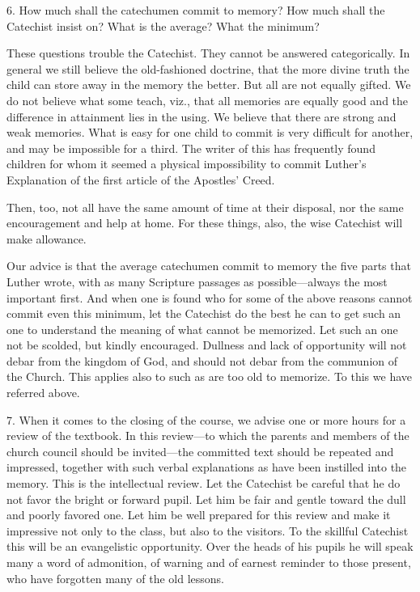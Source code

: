 6. How much shall the catechumen commit to memory? How much shall the Catechist insist on? What is the average? What the minimum?

These questions trouble the Catechist. They cannot be answered categorically. In general we still believe the old-fashioned doctrine, that the more
divine truth the child can store away in the memory the better. But all are not equally gifted.  We do not believe what some teach, viz., that all memories are equally good and the difference in attainment lies in the using. We believe that there are strong and weak memories. What is easy for one child to commit is very difficult for another, and may be impossible for a third. The writer of this has frequently found children for whom it seemed a physical impossibility to commit Luther’s Explanation of the first article of the Apostles’ Creed.

Then, too, not all have the same amount of time at their disposal, nor the same encouragement and help at home. For these things, also, the wise Catechist will make allowance.

Our advice is that the average catechumen commit to memory the five parts that Luther wrote, with as many Scripture passages as possible—always the most important first. And when one is found who for some of the above reasons cannot commit even this minimum, let the Catechist do the best he can to get such an one to understand the meaning of what cannot be memorized. Let such an one not be scolded, but kindly encouraged. Dullness and lack of opportunity will not debar from the kingdom of God, and should not debar from the communion of the Church. This applies also to such as are too old to memorize. To this we have referred above.

7.  When it comes to the closing of the course, we advise one or more hours for a review of the textbook. In this review—to which the parents and members of the church council should be invited—the committed text should be repeated and impressed, together with such verbal explanations as have been instilled into the memory. This is the intellectual review. Let the Catechist be careful that he do not favor the bright or forward pupil. Let him be fair and gentle toward the dull and poorly favored one. Let him be well prepared for this review and make it impressive not only to the class, but also to the visitors. To the skillful Catechist this will be an evangelistic opportunity. Over the heads of his pupils he will speak many a word of admonition, of warning and of earnest reminder to those present, who have forgotten many of the old lessons.

